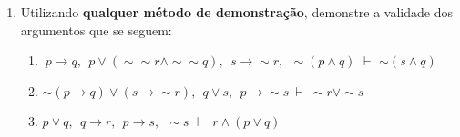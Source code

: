 \documentclass[12pt, a4paper,final]{article}
\begin{document}
\begin{enumerate}

\itemsep 1cm

 \item Utilizando {\bf qualquer método de demonstração}, demonstre a validade dos argumentos que se seguem:

\begin{enumerate}




\item $\ p \rightarrow q, \:\: p \vee (\sim \sim r \wedge \sim \sim  q), \:\: s \rightarrow \sim r, \:\: \sim (p \wedge q) $ {\bf $\vdash $} $\sim (s \wedge q)$

\item \(\sim(p \rightarrow q) \vee (s \rightarrow \sim r),\:\:  q \vee s,\:\: p \rightarrow \sim s ~\vdash~ \sim r \vee \sim s\)







\item $p \vee q, \:\: q \rightarrow r, \:\: p \rightarrow s,  \:\: \sim s $ {\bf $\vdash $} $r \wedge (p \vee q)$





\end{enumerate}
\end{enumerate}
\end{document}
